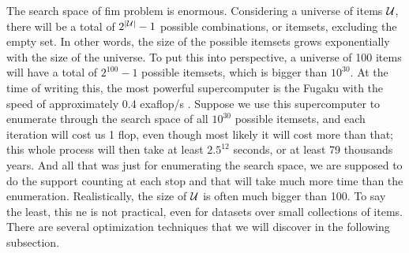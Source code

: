 The search space of \acl{fim} problem is enormous.
Considering a universe of items $\mathcal{U}$, there will be a total of $2^{\left\lvert \mathcal{U} \right\rvert} - 1$ possible combinations, or itemsets, excluding the empty set.
In other words, the size of the possible itemsets grows exponentially with the size of the universe.
To put this into perspective, a universe of 100 items will have a total of $2^{100} - 1$ possible itemsets, which is bigger than $10^{30}$.
At the time of writing this, the most powerful supercomputer is the Fugaku with the speed of approximately 0.4 exaflop/s \citep{monroe_fugaku_2020}.
Suppose we use this supercomputer to enumerate through the search space of all $10^{30}$ possible itemsets, and each iteration will cost us 1 flop, even though most likely it will cost more than that; this whole process will then take at least $2.5^{12}$ seconds, or at least 79 thousands years.
And all that was just for enumerating the search space, we are supposed to do the support counting at each stop and that will take much more time than the enumeration.
Realistically, the size of $\mathcal{U}$ is often much bigger than 100.
To say the least, this \acl{ne} is not practical, even for datasets over small collections of items.
There are several optimization techniques that we will discover in the following subsection.

